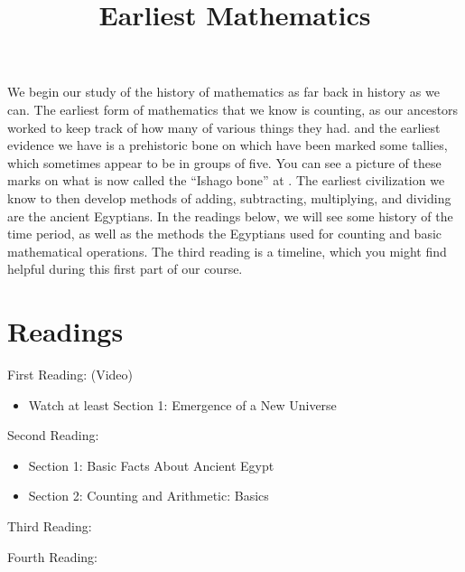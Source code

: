 \documentclass{ximera}
\title{Earliest Mathematics}
\begin{document}
\begin{abstract}
\end{abstract}
\maketitle

We begin our study of the history of mathematics as far back in history as we can.  The earliest form of mathematics that we know is counting, as our 
ancestors worked to keep track of how many of various things they had. and the earliest evidence we have is a prehistoric bone on which have been 
marked some tallies, which sometimes appear to be in groups of five.  You can see a picture of these marks on what is now called the ``Ishago bone'' 
at .  The earliest civilization we know to then develop methods of 
adding, subtracting, multiplying, and dividing are the ancient Egyptians.  In the readings below, we will see some history of the time period, as well as 
the methods the Egyptians used for counting and basic mathematical operations.  The third reading is a timeline, which you might find helpful during 
this first part of our course.




\section{Readings}

First Reading: (Video) 
\begin{itemize}
\item Watch at least Section 1: Emergence of a New Universe
\end{itemize}

Second Reading: 
\begin{itemize}
\item Section 1: Basic Facts About Ancient Egypt
\item Section 2: Counting and Arithmetic: Basics
\end{itemize}

Third Reading: 

Fourth Reading: 
\end{document}
